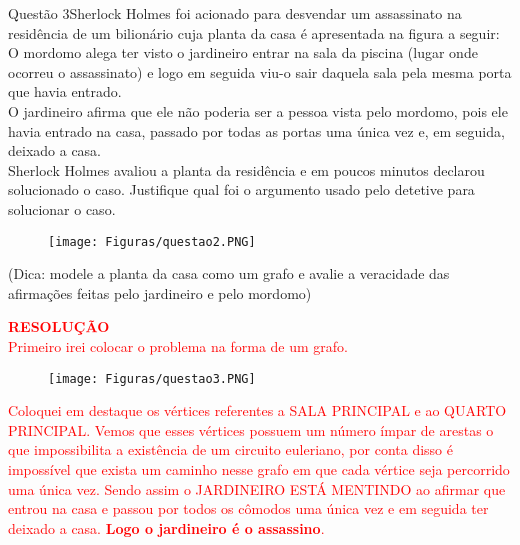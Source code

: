 \documentclass[12pt]{article}
\begin{document}
\newpage
\begin{section}{Questão 3}{Sherlock Holmes foi acionado para desvendar um assassinato na residência de um bilionário cuja planta
da casa é apresentada na figura a seguir:\\

\noindent O mordomo alega ter visto o jardineiro entrar na sala da piscina (lugar onde ocorreu o assassinato) e logo em seguida viu-o sair daquela sala pela mesma porta que havia entrado.\\

\noindent O jardineiro afirma que ele não poderia ser a pessoa vista pelo mordomo, pois ele havia entrado na casa, passado por todas as portas uma única vez e, em seguida, deixado a casa.\\

\noindent Sherlock Holmes avaliou a planta da residência e em poucos minutos declarou solucionado o caso. Justifique qual foi o argumento usado pelo detetive para solucionar o caso.}

\begin{figure}[H]
    \centering
    \texttt{[image: Figuras/questao2.PNG]}
\end{figure}

(Dica: modele a planta da casa como um grafo e avalie a veracidade das afirmações feitas pelo jardineiro e pelo mordomo)
\newpage

\textbf{\textcolor{red}{RESOLUÇÃO}}\\

\textcolor{red}{Primeiro irei colocar o problema na forma de um grafo.}

\begin{figure}[H]
    \centering
    \texttt{[image: Figuras/questao3.PNG]}
\end{figure}

\noindent \textcolor{red}{Coloquei em destaque os vértices referentes a SALA PRINCIPAL e ao QUARTO PRINCIPAL. Vemos que esses vértices possuem um número ímpar de arestas o que impossibilita a existência de um circuito euleriano, por conta disso é impossível que exista um caminho nesse grafo em que cada vértice seja percorrido uma única vez. Sendo assim o JARDINEIRO ESTÁ MENTINDO ao afirmar que entrou na casa  e passou por todos os cômodos uma única vez e em seguida ter deixado a casa. \textbf{Logo o jardineiro é o assassino}.}

\end{section}
\end{document}
